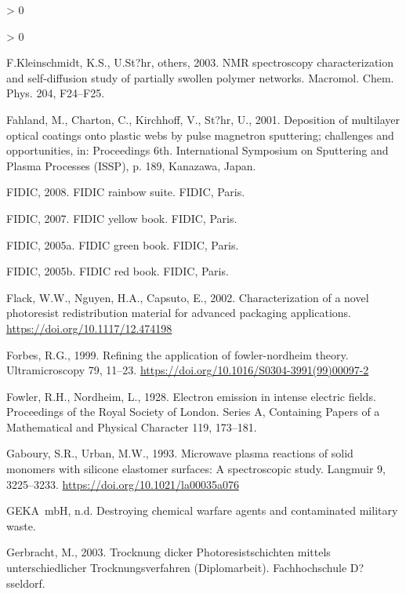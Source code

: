 \documentclass[
  11pt,
  twoside]{article}
\newlength{\cslhangindent}
\newenvironment{CSLReferences}[2] %
 {%
  \setlength{\parindent}{0pt}
  \ifodd #1 \everypar{\setlength{\hangindent}{\cslhangindent}}\ignorespaces\fi
  \ifnum #2 > 0
  \setlength{\parskip}{#2\baselineskip}
  \fi
 }%
 {}
\begin{document}
\begin{CSLReferences}{1}{0}
\begin{CSLReferences}{1}{0}
\leavevmode\hypertarget{ref-Klei03}{}%
F.Kleinschmidt, K.S., U.St?hr, others, 2003. NMR spectroscopy characterization and self-diffusion study of partially swollen polymer networks. Macromol. Chem. Phys. 204, F24--F25.

\leavevmode\hypertarget{ref-Fahl01}{}%
Fahland, M., Charton, C., Kirchhoff, V., St?hr, U., 2001. Deposition of multilayer optical coatings onto plastic webs by pulse magnetron sputtering; challenges and opportunities, in: Proceedings 6th. International Symposium on Sputtering and Plasma Processes (ISSP), p. 189, Kanazawa, Japan.

\leavevmode\hypertarget{ref-FIDICrainbow}{}%
FIDIC, 2008. FIDIC rainbow suite. FIDIC, Paris.

\leavevmode\hypertarget{ref-FIDICyellow}{}%
FIDIC, 2007. FIDIC yellow book. FIDIC, Paris.

\leavevmode\hypertarget{ref-FIDICgreen}{}%
FIDIC, 2005a. FIDIC green book. FIDIC, Paris.

\leavevmode\hypertarget{ref-FIDICred}{}%
FIDIC, 2005b. FIDIC red book. FIDIC, Paris.

\leavevmode\hypertarget{ref-Flac02}{}%
Flack, W.W., Nguyen, H.A., Capsuto, E., 2002. Characterization of a novel photoresist redistribution material for advanced packaging applications. \url{https://doi.org/10.1117/12.474198}

\leavevmode\hypertarget{ref-Forb1999}{}%
Forbes, R.G., 1999. Refining the application of fowler-nordheim theory. Ultramicroscopy 79, 11--23. \url{https://doi.org/10.1016/S0304-3991(99)00097-2}

\leavevmode\hypertarget{ref-Fowl1928}{}%
Fowler, R.H., Nordheim, L., 1928. Electron emission in intense electric fields. Proceedings of the Royal Society of London. Series A, Containing Papers of a Mathematical and Physical Character 119, 173--181.

\leavevmode\hypertarget{ref-Gabo1993}{}%
Gaboury, S.R., Urban, M.W., 1993. Microwave plasma reactions of solid monomers with silicone elastomer surfaces: A spectroscopic study. Langmuir 9, 3225--3233. \url{https://doi.org/10.1021/la00035a076}

\leavevmode\hypertarget{ref-GEKA}{}%
GEKA~mbH, n.d. Destroying chemical warfare agents and contaminated military waste.

\leavevmode\hypertarget{ref-Gerb03}{}%
Gerbracht, M., 2003. {Trocknung dicker Photoresistschichten mittels unterschiedlicher Trocknungsverfahren} (Diplomarbeit). Fachhochschule D?sseldorf.


\end{CSLReferences}
\end{CSLReferences}
\end{document}
